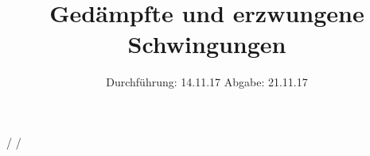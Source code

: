 

\subject{V354}
\title{Gedämpfte und erzwungene Schwingungen}
\date{%
  Durchführung: 14.11.17
  \hspace{3em}
  Abgabe: 21.11.17
}



\maketitle
\thispagestyle{empty}
\tableofcontents
\newpage



/ 
/ 

\printbibliography{}


